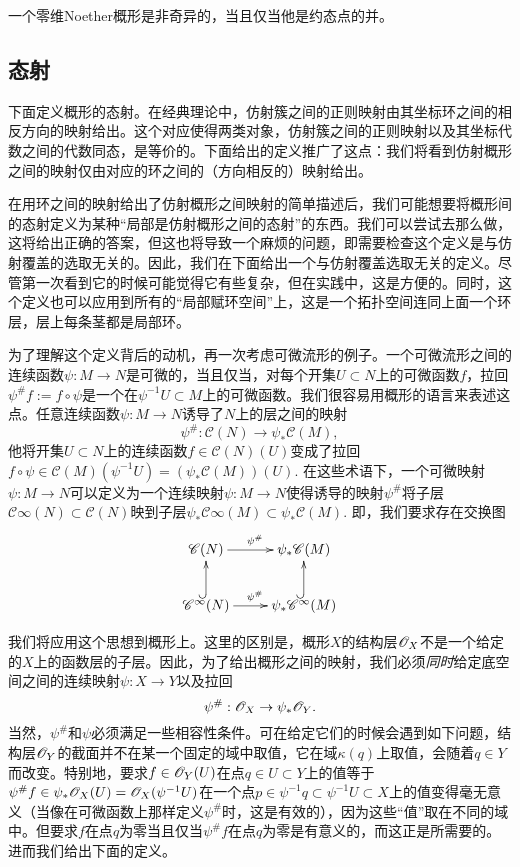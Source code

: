 \begin{exe}
一个零维Noether概形是非奇异的，当且仅当他是约态点的并。
\end{exe}

\subsection{态射} \label{s:1.2.3}

下面定义概形的态射。在经典理论中，仿射簇之间的正则映射由其坐标环之间的相反方向的映射给出。这个对应使得两类对象，仿射簇之间的正则映射以及其坐标代数之间的代数同态，是等价的。下面给出的定义推广了这点：我们将看到仿射概形之间的映射仅由对应的环之间的（方向相反的）映射给出。

在用环之间的映射给出了仿射概形之间映射的简单描述后，我们可能想要将概形间的态射定义为某种“局部是仿射概形之间的态射”的东西。我们可以尝试去那么做，这将给出正确的答案，但这也将导致一个麻烦的问题，即需要检查这个定义是与仿射覆盖的选取无关的。因此，我们在下面给出一个与仿射覆盖选取无关的定义。尽管第一次看到它的时候可能觉得它有些复杂，但在实践中，这是方便的。同时，这个定义也可以应用到所有的“局部赋环空间”上，这是一个拓扑空间连同上面一个环层，层上每条茎都是局部环。

为了理解这个定义背后的动机，再一次考虑可微流形的例子。一个可微流形之间的连续函数$\psi:M\to N$是可微的，当且仅当，对每个开集$U\subset N$上的可微函数$f$，拉回$\psi^\# f:=f\circ \psi$是一个在$\psi^{-1}U\subset M$上的可微函数。我们很容易用概形的语言来表述这点。任意连续函数$\psi:M\to N$诱导了$N$上的层之间的映射
\[
	\psi^\#:\mathscr C(N)\to \psi_*\mathscr C(M),
\]
他将开集$U\subset N$上的连续函数$f\in \mathscr C(N)(U)$变成了拉回$f\circ \psi\in \mathscr C(M)(\psi^{-1}U)=(\psi_*\mathscr C(M))(U)$. 在这些术语下，一个可微映射$\psi:M\to N$可以定义为一个连续映射$\psi:M\to N$使得诱导的映射$\psi^\#$将子层$\mathscr C\infty(N)\subset \mathscr C(N)$映到子层$\psi_*\mathscr C\infty(M)\subset \psi_*\mathscr C(M)$. 即，我们要求存在交换图
\[
	\xymatrix{
	\mathscr C(N)\ar[r]^{\psi^\#}&\psi_*\mathscr C(M)\\
	\mathscr C^\infty(N)\ar[r]^{\psi^\#}\ar@{^{(}->}[u]&\psi_*\mathscr C^\infty(M)\ar@{^{(}->}[u]
	}
\]

我们将应用这个思想到概形上。这里的区别是，概形$X$的结构层$\mathscr{O}_X$不是一个给定的$X$上的函数层的子层。因此，为了给出概形之间的映射，我们必须\textit{同时}给定底空间之间的连续映射$\psi:X\to Y$以及拉回
\[
	\psi^\#:\mathscr{O}_X\to\psi_*\mathscr{O}_Y.
\]
当然，$\psi^\#$和$\psi$必须满足一些相容性条件。可在给定它们的时候会遇到如下问题，结构层$\mathscr{O}_Y$的截面并不在某一个固定的域中取值，它在域$\kappa(q)$上取值，会随着$q\in Y$而改变。特别地，要求$f\in\mathscr{O}_Y(U)$在点$q\in U\subset Y$上的值等于$\psi^\# f\in \psi_*\mathscr{O}_X(U)=\mathscr{O}_X(\psi^{-1}U)$在一个点$p\in \psi^{-1}q\subset \psi^{-1}U\subset X$上的值变得毫无意义（当像在可微函数上那样定义$\psi^\#$时，这是有效的），因为这些“值”取在不同的域中。但要求$f$在点$q$为零当且仅当$\psi^\# f$在点$q$为零是有意义的，而这正是所需要的。进而我们给出下面的定义。

